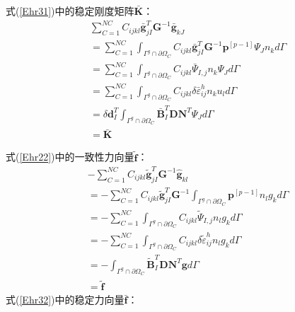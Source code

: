\newpage
式(\ref{Ehr31})中的稳定刚度矩阵$\bar{\pmb{K}}$：
\begin{equation}\label{CH4-barK}
\begin{split}
    &\sum_{C=1}^{N\!C}C_{ijkl}\bar{\pmb g}^T_{jI}\pmb{G}^{-1}\bar{\pmb g}_{kJ}\\
    &=\sum_{C=1}^{N\!C}\int_{\Gamma^g\cap\partial\Omega_C}C_{ijkl}\bar{\pmb g}_{jI}^T\pmb{G}^{-1}\pmb{p}^{[p-1]}\Psi_Jn_kd\Gamma\\
    &=\sum_{C=1}^{N\!C}\int_{\Gamma^g\cap\partial\Omega_C}C_{ijkl}\bar{\Psi}_{I,j}n_k\Psi_{J}d\Gamma\\
    &=\sum_{C=1}^{N\!C}\int_{\Gamma^g\cap\partial\Omega_C}C_{ijkl}\delta\bar{\varepsilon}_{ij}^hn_ku_ld\Gamma\\
    &=\delta\pmb{d}_I^T\int_{\Gamma^g\cap\partial\Omega_C}\bar{\pmb{B}}_I^T\pmb{D}\pmb{N}^T\Psi_Jd\Gamma\\
    &=\bar{\pmb{K}}
\end{split}
\end{equation}
\par
式(\ref{Ehr22})中的一致性力向量$\tilde{\pmb{f}}$：
\begin{equation}\label{CH4-tildef}
\begin{split}
    &-\sum_{C=1}^{N\!C}C_{ijkl}\tilde{\pmb g}^T_{jI}\pmb{G}^{-1}\hat{\pmb g}_{kl}\\
    &=-\sum_{C=1}^{N\!C}C_{ijkl}\tilde{\pmb g}^T_{jI}\pmb{G}^{-1}\int_{\Gamma^g\cap\partial\Omega_C}\pmb{p}^{[p-1]}n_lg_kd\Gamma\\
    &=-\sum_{C=1}^{N\!C}\int_{\Gamma^g\cap\partial\Omega_C}C_{ijkl}\tilde{\Psi}_{I,j}n_lg_kd\Gamma\\
    &=-\sum_{C=1}^{N\!C}\int_{\Gamma^g\cap\partial\Omega_C}C_{ijkl}\delta\tilde{\varepsilon}_{ij}^hn_lg_kd\Gamma\\
    &=-\int_{\Gamma^g\cap\partial\Omega_C}\tilde{\pmb{B}}_I^T\pmb{D}\pmb{N}^T\pmb{g}d\Gamma\\
    &=\tilde{\pmb f}
\end{split}
\end{equation}
\newpage
式(\ref{Ehr32})中的稳定力向量$\bar{\pmb{f}}$：
